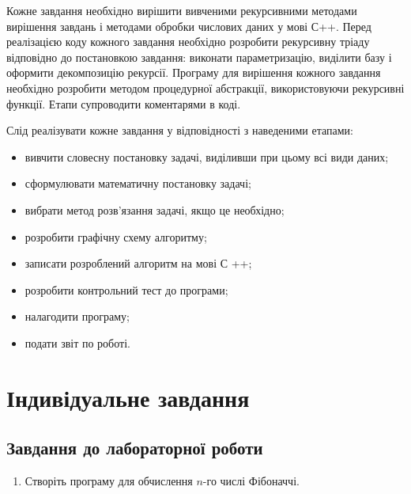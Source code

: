 Кожне завдання необхідно вирішити вивченими рекурсивними методами вирішення завдань і методами обробки числових даних у мові С++. Перед реалізацією коду кожного завдання необхідно розробити рекурсивну тріаду відповідно до постановкою завдання: виконати параметризацію, виділити базу і оформити декомпозицію рекурсії. Програму для вирішення кожного завдання необхідно розробити методом процедурної абстракції, використовуючи рекурсивні функції. Етапи супроводити коментарями в коді.

Слід реалізувати кожне завдання у відповідності з наведеними етапами:

\begin{itemize}
\item вивчити словесну постановку задачі, виділивши при цьому всі види даних;
\item сформулювати математичну постановку задачі;
\item вибрати метод розв'язання задачі, якщо це необхідно;
\item розробити графічну схему алгоритму;
\item записати розроблений алгоритм на мові С ++;
\item розробити контрольний тест до програми;
\item налагодити програму;
\item подати звіт по роботі. 
\end{itemize}



\section{Індивідуальне завдання}
\nopagebreak[4]
\subsection*{Завдання до лабораторної роботи}
\nopagebreak[4]
\begin{enumerate}
\item Створіть програму для обчислення $n$-го числі Фібоначчі.

\end{enumerate}

